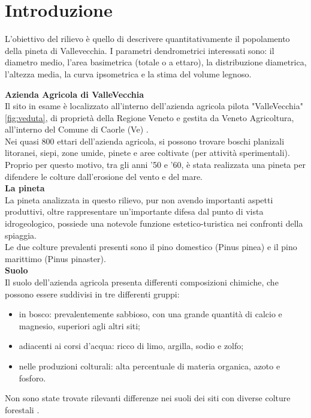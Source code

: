 \section{Introduzione}
L'obiettivo del rilievo è quello di descrivere quantitativamente il popolamento della pineta di Vallevecchia. I parametri dendrometrici interessati sono: il diametro medio, l'area basimetrica (totale o a ettaro), la distribuzione diametrica, l'altezza media, la curva ipsometrica e la stima del volume legnoso.

\textbf{Azienda Agricola di ValleVecchia}\\
Il sito in esame è localizzato all'interno dell'azienda agricola pilota "ValleVecchia" \ref{fig:veduta}, di proprietà della Regione Veneto e gestita da Veneto Agricoltura, all'interno del Comune di Caorle (Ve) \cite{veneto_agr}.\\
Nei quasi 800 ettari dell'azienda agricola, si possono trovare boschi planizali litoranei, siepi, zone umide, pinete e aree coltivate (per attività sperimentali).\\
Proprio per questo motivo, tra gli anni '50 e '60, è stata realizzata una pineta per difendere le colture dall'erosione del vento e del mare.\\
\textbf{La pineta}\\
La pineta analizzata in questo rilievo, pur non avendo importanti aspetti produttivi, oltre rappresentare un'importante difesa dal punto di vista idrogeologico, possiede una notevole funzione estetico-turistica nei confronti della spiaggia. \cite{tesi_rossetti}\\
Le due colture prevalenti presenti sono il pino domestico (Pinus pinea) e il pino marittimo (Pinus pinaster).\\
\textbf{Suolo}\\
Il suolo dell'azienda agricola presenta differenti composizioni chimiche, che possono essere suddivisi in tre differenti gruppi:
\begin{itemize}
    \item in bosco: prevalentemente sabbioso, con una grande quantità di calcio e magnesio, superiori agli altri siti;
    \item adiacenti ai corsi d'acqua: ricco di limo, argilla, sodio e zolfo;
    \item nelle produzioni colturali: alta percentuale di materia organica, azoto e fosforo.
\end{itemize}
Non sono state trovate rilevanti differenze nei suoli dei siti con diverse colture forestali \cite{tesi_paoletti}.\\

